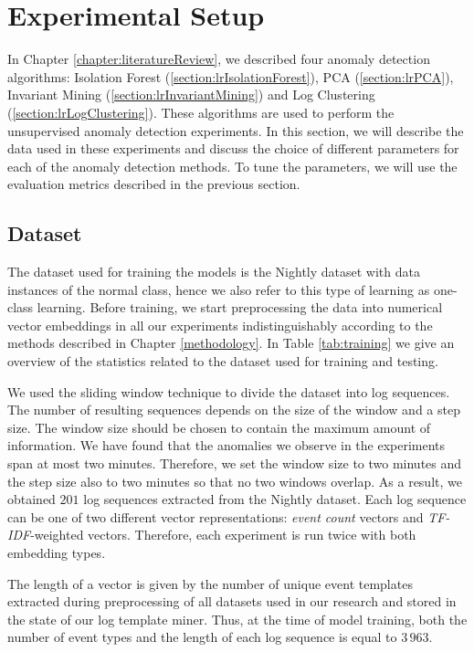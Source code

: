 \section{Experimental Setup}
\label{section:experimental-setup}
In Chapter \ref{chapter:literatureReview}, we described four anomaly detection algorithms: Isolation Forest (\ref{section:lrIsolationForest}), PCA (\ref{section:lrPCA}), Invariant Mining (\ref{section:lrInvariantMining}) and Log Clustering (\ref{section:lrLogClustering}). These algorithms are used to perform the unsupervised anomaly detection experiments. In this section, we will describe the data used in these experiments and discuss the choice of different parameters for each of the anomaly detection methods. To tune the parameters, we will use the evaluation metrics described in the previous section.

\subsection{Dataset}
The dataset used for training the models is the Nightly dataset with data instances of the normal class, hence we also refer to this type of learning as one-class learning. Before training, we start preprocessing the data into numerical vector embeddings in all our experiments indistinguishably according to the methods described in Chapter \ref{methodology}. In Table \ref{tab:training} we give an overview of the statistics related to the dataset used for training and testing.

We used the sliding window technique to divide the dataset into log sequences. The number of resulting sequences depends on the size of the window and a step size. The window size should be chosen to contain the maximum amount of information. We have found that the anomalies we observe in the experiments span at most two minutes. Therefore, we set the window size to two minutes and the step size also to two minutes so that no two windows overlap. As a result, we obtained $201$ log sequences extracted from the Nightly dataset. Each log sequence can be one of two different vector representations: \textit{event count} vectors and \textit{TF-IDF}-weighted vectors. Therefore, each experiment is run twice with both embedding types.

The length of a vector is given by the number of unique event templates extracted during preprocessing of all datasets used in our research and stored in the state of our log template miner. Thus, at the time of model training, both the number of event types and the length of each log sequence is equal to $3\,963$.

